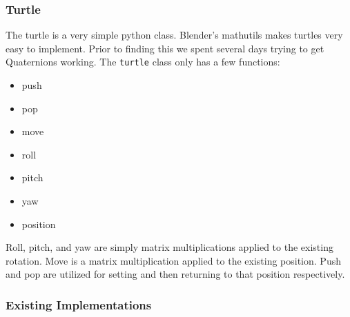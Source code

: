 \subsubsection{Turtle}
The turtle is a very simple python class. Blender's mathutils makes turtles
very easy to implement. Prior to finding this we spent several days trying to
get Quaternions working. The \texttt{turtle} class only has a few
functions:

\begin{itemize}
    \item push
    \item pop
    \item move
    \item roll
    \item pitch
    \item yaw
    \item position
\end{itemize}

Roll, pitch, and yaw are simply matrix multiplications applied to the existing
rotation. Move is a matrix multiplication applied to the existing position.
Push and pop are utilized for setting and then returning to that position
respectively.


\subsubsection{Existing Implementations}



